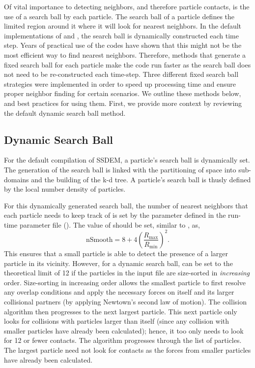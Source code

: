 Of vital importance to detecting neighbors, and therefore particle
contacts, is the use of a search ball by each particle. The search
ball of a particle defines the limited region around it where it will
look for nearest neighbors. In the default implementations of
 and , the search ball is dynamically
constructed each time step. Years of practical use of the codes have
shown that this might not be the most efficient way to find nearest
neighbors. Therefore, methods that generate a fixed search ball for
each particle make the code run faster as the search ball does not
need to be re-constructed each time-step. Three different fixed search
ball strategies were implemented in order to speed up processing time
and ensure proper neighbor finding for certain 
scenarios. We outline these methods below, and best practices for
using them. First, we provide more context by reviewing the default
dynamic search ball method.

\subsection{Dynamic Search Ball}

For the default compilation of SSDEM, a particle's search ball is
dynamically set. The generation of the search ball is linked with the
partitioning of space into sub-domains and the building of the k-d
tree. A particle's search ball is thusly defined by the local number
density of particles.

For this dynamically generated search ball, the number of nearest
neighbors that each particle needs to keep track of is set by the
 parameter defined in the run-time parameter file
(). The value of  should be set, similar to
, as,
\begin{equation}
  \mathrm{nSmooth} = 8 + 4 \left(
  \frac{R_{\mathrm{max}}}{R_{\mathrm{min}}} \right)^2
  . \label{e:nsmooth}
\end{equation}
This ensures that a small particle is able to detect the presence of a
larger particle in its vicinity. However, for a dynamic search ball,
 can be set to the theoretical
limit of 12 if the particles in the input file are size-sorted in
\emph{increasing} order. Size-sorting in increasing order allows the
smallest particle to first resolve any overlap conditions and apply
the necessary forces on itself and its larger collisional partners (by
applying Newtown's second law of motion). The collision algorithm then
progresses to the next largest particle. This next particle only looks
for collisions with particles larger than itself (since any collision
with smaller particles have already been calculated); hence, it too
only needs to look for 12 or fewer contacts. The algorithm progresses
through the list of particles. The largest particle need not look for
contacts as the forces from smaller particles have already been
calculated.

